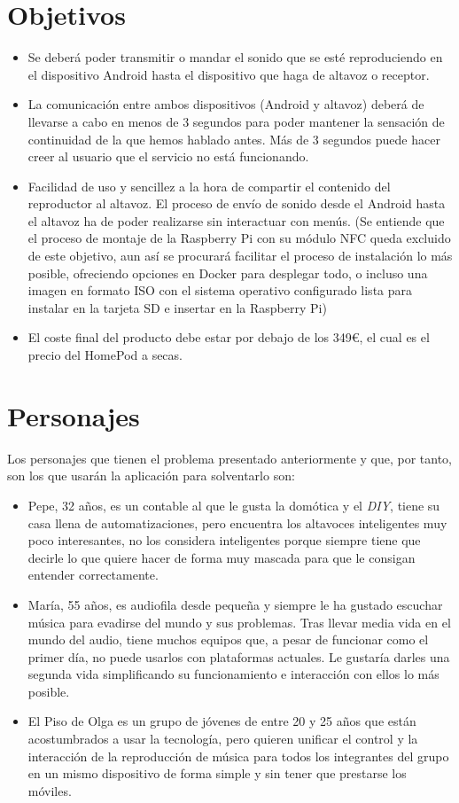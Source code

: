 \section{Objetivos}
\begin{itemize}
    \item Se deberá poder transmitir o mandar el sonido que se esté
    reproduciendo en el dispositivo Android hasta el dispositivo que haga de
    altavoz o receptor.
    \item La comunicación entre ambos dispositivos (Android y altavoz) deberá de
    llevarse a cabo en menos de 3 segundos para poder mantener la sensación de
    continuidad de la que hemos hablado antes. Más de 3 segundos puede hacer
    creer al usuario que el servicio no está funcionando.
    \item Facilidad de uso y sencillez a la hora de compartir el contenido del
    reproductor al altavoz. El proceso de envío de sonido desde el Android hasta
    el altavoz ha de poder realizarse sin interactuar con menús. (Se entiende
    que el proceso de montaje de la Raspberry Pi con su módulo NFC queda
    excluido de este objetivo, aun así se procurará facilitar el proceso de
    instalación lo más posible, ofreciendo opciones en Docker para desplegar
    todo, o incluso una imagen en formato ISO con el sistema operativo
    configurado lista para instalar en la tarjeta SD e insertar en la Raspberry
    Pi)
    \item El coste final del producto debe estar por debajo de los 349€, el cual
    es el precio del HomePod a secas.
\end{itemize}

\section{Personajes}
Los personajes que tienen el problema presentado anteriormente y que, por tanto,
son los que usarán la aplicación para solventarlo son:
\begin{itemize}
    \item Pepe, 32 años, es un contable al que le gusta la domótica y el
    \emph{DIY}, tiene su casa llena de automatizaciones, pero encuentra los
    altavoces inteligentes muy poco interesantes, no los considera inteligentes
    porque siempre tiene que decirle lo que quiere hacer de forma muy mascada
    para que le consigan entender correctamente. 
    \item María, 55 años, es audiofila desde pequeña y siempre le ha gustado
    escuchar música para evadirse del mundo y sus problemas. Tras llevar media
    vida en el mundo del audio, tiene muchos equipos que, a pesar de funcionar
    como el primer día, no puede usarlos con plataformas actuales. Le gustaría
    darles una segunda vida simplificando su funcionamiento e interacción con
    ellos lo más posible. 
    \item El Piso de Olga es un grupo de jóvenes de entre 20 y 25 años que están
    acostumbrados a usar la tecnología, pero quieren unificar el control y la
    interacción de la reproducción de música para todos los integrantes del
    grupo en un mismo dispositivo de forma simple y sin tener que prestarse los
    móviles.
\end{itemize}

